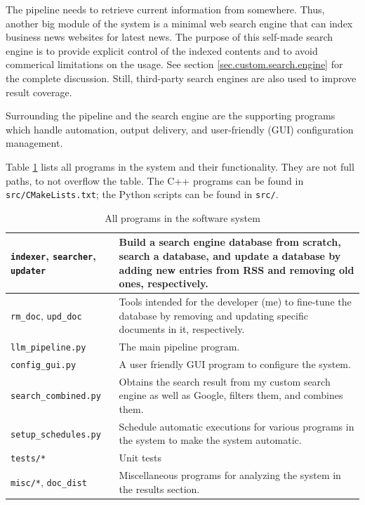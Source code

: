 \documentclass[final-report]{report-template}
\newcommand\ttb{\discretionary{}{}{}}
\begin{document}
The pipeline needs to retrieve current information from somewhere. Thus,
another big module of the system is a minimal web search engine that can index
business news websites for latest news. The purpose of this self-made search
engine is to provide explicit control of the indexed contents and to avoid
commerical limitations on the usage. See section \ref{sec.custom.search.engine}
for the complete discussion. Still, third-party search engines are also used to
improve result coverage.

Surrounding the pipeline and the search engine are the supporting programs
which handle automation, output delivery, and user-friendly (GUI) configuration
management.

Table \ref{table.all.programs} lists all programs in the system and their
functionality. They are not full paths, to not overflow the table. The
C++ programs can be found in \texttt{src/\ttb CMakeLists.\ttb txt}; the Python
scripts can be found in \texttt{src/}.
\begin{table}[hbtp!]
\centering
\begin{tabular}{|p{4cm}|p{10cm}|}
	\hline
	\verb!indexer!, \verb!searcher!, \verb!updater! &
	Build a search engine database from scratch, search a database, and update a
	database by adding new entries from RSS and removing old ones,
	respectively. 
	\\ \hline
	\verb!rm_doc!, \verb!upd_doc! &
	Tools intended for the developer (me) to fine-tune the database by removing
	and updating specific documents in it, respectively.
	\\ \hline
	\verb!llm_pipeline.py! & The main pipeline program. 
	\\ \hline
	\verb!config_gui.py! & A user friendly GUI program to configure the system.
	\\ \hline
	\verb!search_combined.py! & Obtains the search result from my custom
	search engine as well as Google, filters them, and combines them.
	\\ \hline
	\verb!setup_schedules.py! & Schedule automatic executions for various
	programs in the system to make the system automatic.
	\\ \hline
	\verb!tests/*! & Unit tests	
	\\ \hline
	\verb!misc/*!, \texttt{doc\_\ttb dist} & Miscellaneous programs for
	analyzing the system in the results section.
	\\ \hline
\end{tabular}
\caption{All programs in the software system}
\label{table.all.programs}
\end{table}
\end{document}
